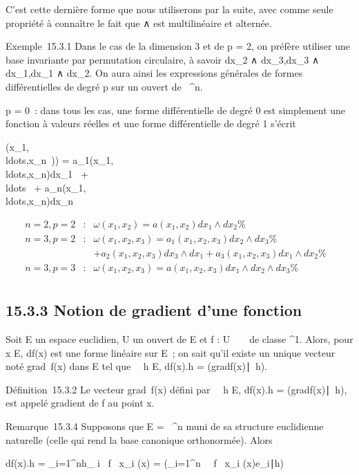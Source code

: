 \documentclass[]{article}
\begin{document}
C'est cette dernière forme que nous utiliserons par la suite, avec comme
seule propriété à connaître le fait que ∧ est multilinéaire et alternée.

Exemple~15.3.1 Dans le cas de la dimension 3 et de p = 2, on préfère
utiliser une base invariante par permutation circulaire, à savoir
dx_2 ∧ dx_3,dx_3 ∧
dx_1,dx_1 ∧ dx_2. On aura ainsi les
expressions générales de formes différentielles de degré p sur un ouvert
de ~^n.

p = 0~: dans tous les cas, une forme différentielle de degré 0 est
simplement une fonction à valeurs réelles et une forme différentielle de
degré 1 s'écrit

\omega(x_1,\\ldots,x_n~))
=
a_1(x_1,\\ldots,x_n)dx_1~
+ \\ldots~ +
a_n(x_1,\\ldots,x_n)dx_n~

\begin{align*} n = 2,p = 2& :&
\omega(x_1,x_2) = a(x_1,x_2)dx_1
∧ dx_2 \%& \\ n = 3,p = 2& :&
\omega(x_1,x_2,x_3) =
a_1(x_1,x_2,x_3)dx_2 ∧
dx_3 \%& \\ & &
+a_2(x_1,x_2,x_3)dx_3 ∧
dx_1 +
a_3(x_1,x_2,x_3)dx_1 ∧
dx_2\%& \\ n = 3,p = 3& :&
\omega(x_1,x_2,x_3) =
a(x_1,x_2,x_3)dx_1 ∧ dx_2 ∧
dx_3 \%& \\
\end{align*}

\subsection{15.3.3 Notion de gradient d'une fonction}

Soit E un espace euclidien, U un ouvert de E et f : U \rightarrow~ ~ de classe
^1. Alors, pour x \in E, df(x) est une forme linéaire sur E~;
on sait qu'il existe un unique vecteur noté
grad~f(x) dans E tel que
\forall~~h \in E, df(x).h =
(gradf(x)\mathrel∣~h).

Définition~15.3.2 Le vecteur grad~f(x) défini
par \forall~~h \in E, df(x).h =
(gradf(x)\mathrel∣~h), est
appelé gradient de f au point x.

Remarque~15.3.4 Supposons que E = ~^n muni de sa structure
euclidienne naturelle (celle qui rend la base canonique orthonormée).
Alors

df(x).h = \sum _i=1^nh_
i \partial~f \over \partial~x_i (x) =
(\sum _i=1^n~ \partial~f
\over \partial~x_i
(x)e_i∣h)
\end{document}
